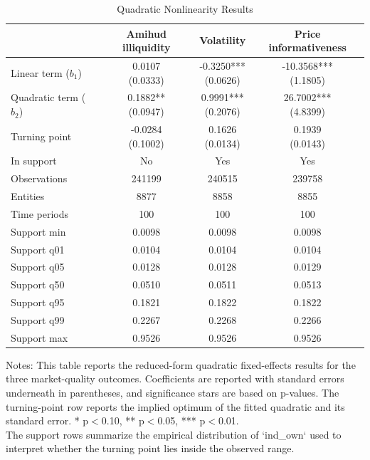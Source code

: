 \begin{table}[!htbp]\centering
\caption{Quadratic Nonlinearity Results}
\label{tab:nonlinear_quadratic_results}
\begin{threeparttable}
\footnotesize
\setlength{\tabcolsep}{3.5pt}
\renewcommand{\arraystretch}{1.05}
\begin{tabular}{lccc}
\toprule
 & Amihud illiquidity & Volatility & Price informativeness \\
\midrule
Linear term ($b_1$) & \shortstack{0.0107\\(0.0333)} & \shortstack{-0.3250***\\(0.0626)} & \shortstack{-10.3568***\\(1.1805)} \\
Quadratic term ($b_2$) & \shortstack{0.1882**\\(0.0947)} & \shortstack{0.9991***\\(0.2076)} & \shortstack{26.7002***\\(4.8399)} \\
Turning point & \shortstack{-0.0284\\(0.1002)} & \shortstack{0.1626\\(0.0134)} & \shortstack{0.1939\\(0.0143)} \\
In support & No & Yes & Yes \\
\midrule
Observations & 241199 & 240515 & 239758 \\
Entities & 8877 & 8858 & 8855 \\
Time periods & 100 & 100 & 100 \\
Support min & 0.0098 & 0.0098 & 0.0098 \\
Support q01 & 0.0104 & 0.0104 & 0.0104 \\
Support q05 & 0.0128 & 0.0128 & 0.0129 \\
Support q50 & 0.0510 & 0.0511 & 0.0513 \\
Support q95 & 0.1821 & 0.1822 & 0.1822 \\
Support q99 & 0.2267 & 0.2268 & 0.2266 \\
Support max & 0.9526 & 0.9526 & 0.9526 \\
\bottomrule
\end{tabular}
\vspace{0.35em}
\noindent\parbox{\textwidth}{\footnotesize
Notes: This table reports the reduced-form quadratic fixed-effects results for the three market-quality outcomes. Coefficients are reported with standard errors underneath in parentheses, and significance stars are based on p-values. The turning-point row reports the implied optimum of the fitted quadratic and its standard error. * p$<$0.10, ** p$<$0.05, *** p$<$0.01.\\
The support rows summarize the empirical distribution of `ind_own` used to interpret whether the turning point lies inside the observed range.
}
\end{threeparttable}
\end{table}
